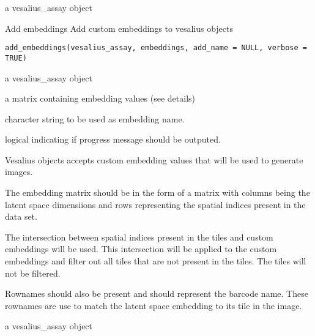 \documentclass[a4paper]{book}
\begin{document}
%
\begin{Value}
a vesalius\_assay object
\end{Value}
%
\begin{Description}
Add embeddings
Add custom embeddings to vesalius objects
\end{Description}
%
\begin{Usage}
\begin{verbatim}
add_embeddings(vesalius_assay, embeddings, add_name = NULL, verbose = TRUE)
\end{verbatim}
\end{Usage}
%
\begin{Arguments}
\begin{ldescription}
\item[\code{vesalius\_assay}] a vesalius\_assay object

\item[\code{embeddings}] a matrix containing embedding values (see details)

\item[\code{add\_name}] character string to be used as embedding name.

\item[\code{verbose}] logical indicating if progress message should be outputed.
\end{ldescription}
\end{Arguments}
%
\begin{Details}
Vesalius objects accepts custom embedding values that will be
used to generate images.

The embedding matrix should be in the form of a matrix with columns being
the latent space dimensiions and rows representing the spatial indices
present in the data set.

The intersection between spatial indices present in the tiles and
custom embeddings will be used.
This intersection will be applied to the custom embeddings and filter
out all tiles that are not present in the tiles. The tiles will not
be filtered.

Rownames should also be present and should represent the barcode name.
These rownames are use to match the latent space embedding to its tile
in the image.
\end{Details}
%
\begin{Value}
a vesalius\_assay object
\end{Value}
\end{document}
